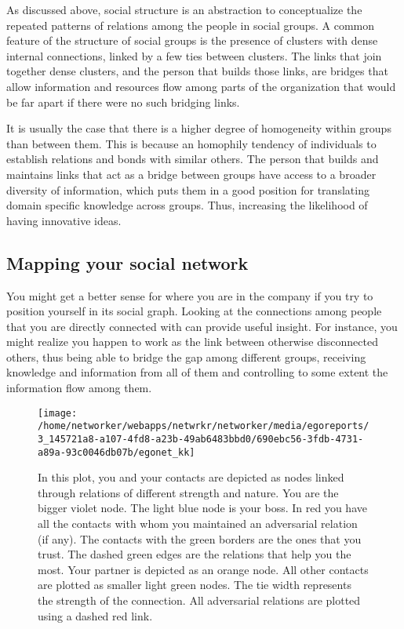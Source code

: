 \documentclass[a4paper,12pt]{article}
\begin{document}
As discussed above, social structure is an abstraction to conceptualize the repeated patterns of relations among the people in social groups. A common feature of the structure of social groups is the presence of clusters with dense internal connections, linked by a few ties between clusters. The links that join together dense clusters, and the person that builds those links, are bridges that allow information and resources flow among parts of the organization that would be far apart if there were no such bridging links.

It is usually the case that there is a higher degree of homogeneity within groups than between them. This is because an homophily tendency of individuals to establish relations and bonds with similar others. The person that builds and maintains links that act as a bridge between groups have access to a broader diversity of information, which puts them in a good position for translating domain specific knowledge across groups. Thus, increasing the likelihood of having innovative ideas.


\newpage


\subsection*{Mapping your social network}


You might get a better sense for where you are in the company if you try to position yourself in its social graph. Looking at the connections among people that you are directly connected with can provide useful insight. For instance, you might realize you happen to work as the link between otherwise disconnected others, thus being able to bridge the gap among different groups, receiving knowledge and information from all of them and controlling to some extent the information flow among them.


\begin{figure}[H]
\centering
\texttt{[image: /home/networker/webapps/netwrkr/networker/media/egoreports/3\_145721a8-a107-4fd8-a23b-49ab6483bbd0/690ebc56-3fdb-4731-a89a-93c0046db07b/egonet\_kk]}
\caption{In this plot, you and your contacts are depicted as nodes linked through relations of different strength and nature. You are the bigger violet node. The light blue node is your boss. In red you have all the contacts with whom you maintained an adversarial relation (if any). The contacts with the green borders are the ones that you trust. The dashed green edges are the relations that help you the most. Your partner is depicted as an orange node. All other contacts are plotted as smaller light green nodes. The tie width represents the strength of the connection. All adversarial relations are plotted using a dashed red link.}
\end{figure}
\end{document}
